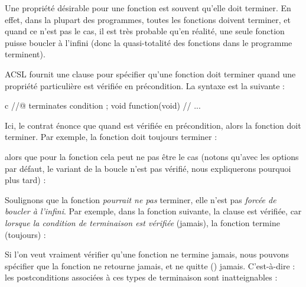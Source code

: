 \label{l3:statements-function-calls-terminates}


Une propriété désirable pour une fonction est souvent qu'elle doit terminer.
En effet, dans la plupart des programmes, toutes les fonctions doivent terminer,
et quand ce n'est pas le cas, il est très probable qu'en réalité, une seule
fonction puisse boucler à l'infini (donc la quasi-totalité des fonctions dans le
programme terminent).




ACSL fournit une clause  pour spécifier qu'une fonction
doit terminer quand une propriété particulière est vérifiée en précondition. La
syntaxe est la suivante :


\begin{CodeBlock}{c}
//@ terminates condition ;
void function(void){
  // ...
}
\end{CodeBlock}


Ici, le contrat énonce que quand  est vérifiée en
précondition, alors la fonction doit terminer. Par exemple, la fonction
 doit toujours terminer :




alors que pour la fonction  cela peut ne pas être le cas
(notons qu'avec les options par défaut, le variant de la boucle n'est pas
vérifié, nous expliquerons pourquoi plus tard) :




Soulignons que la fonction \textit{pourrait ne pas} terminer, elle n'est pas
\textit{forcée de boucler à l'infini}. Par exemple, dans la fonction suivante,
la clause  est vérifiée, car
\textit{lorsque la condition de terminaison est vérifiée} (jamais), la fonction
termine (toujours) :




\begin{Information}
  Si l'on veut vraiment vérifier qu'une fonction ne termine jamais, nous pouvons
  spécifier que la fonction ne retourne jamais, et ne quitte ()
  jamais. C'est-à-dire : les postconditions associées à ces types de terminaison
  sont inatteignables :

\end{Information}


